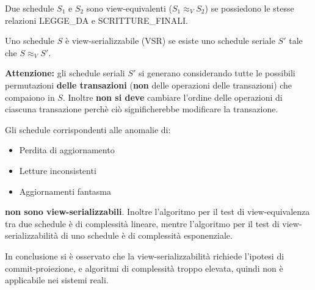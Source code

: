 \documentclass[a4paper]{article}
\begin{document}
\begin{definition}
  Due schedule \( S_1 \) e \( S_2 \) sono view-equivalenti (\( S_1 \approx_V S_2 \))
  se possiedono le stesse relazioni LEGGE\_DA e SCRITTURE\_FINALI.
\end{definition}

\begin{definition}
  Uno schedule \( S \) è view-serializzabile (VSR) se esiste uno schedule seriale \( S' \)
  tale che \( S \approx_V S' \).

  \vspace{1em}
  \noindent
  \textbf{Attenzione:} gli schedule seriali \( S' \) si generano considerando tutte le
  possibili permutazioni \textbf{delle transazioni} (\textbf{non} delle operazioni
  delle transazioni) che compaiono in \( S \). Inoltre \textbf{non
  si deve} cambiare l'ordine delle operazioni di ciascuna transazione perchè ciò
  significherebbe modificare la transazione.
\end{definition}

\noindent
Gli schedule corrispondenti alle anomalie di:
\begin{itemize}
  \item Perdita di aggiornamento
  \item Letture inconsistenti
  \item Aggiornamenti fantasma
\end{itemize}
\textbf{non sono view-serializzabili}. Inoltre l'algoritmo per il test di view-equivalenza
tra due schedule è di complessità lineare, mentre l'algoritmo per il test di
view-serializzabilità di uno schedule è di complessità esponenziale.

\vspace{1em}
\noindent
In conclusione si è osservato che la view-serializzabilità richiede l'ipotesi di
commit-proiezione, e algoritmi di complessità troppo elevata, quindi non è applicabile
nei sistemi reali.
\end{document}
